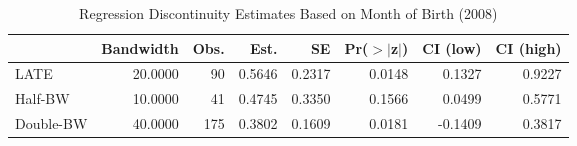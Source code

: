 \begin{table}[ht]
\centering
\begin{tabular}{lrrrrrrr}
  \hline
 & Bandwidth & Obs. & Est. & SE & Pr($>$$|$z$|$) & CI (low) & CI (high) \\ 
  \hline
LATE & 20.0000 & 90 & 0.5646 & 0.2317 & 0.0148 & 0.1327 & 0.9227 \\ 
  Half-BW & 10.0000 & 41 & 0.4745 & 0.3350 & 0.1566 & 0.0499 & 0.5771 \\ 
  Double-BW & 40.0000 & 175 & 0.3802 & 0.1609 & 0.0181 & -0.1409 & 0.3817 \\ 
   \hline
\end{tabular}
\caption{Regression Discontinuity Estimates Based on Month of Birth (2008)} 
\label{tab:rd2008m2}
\end{table}

